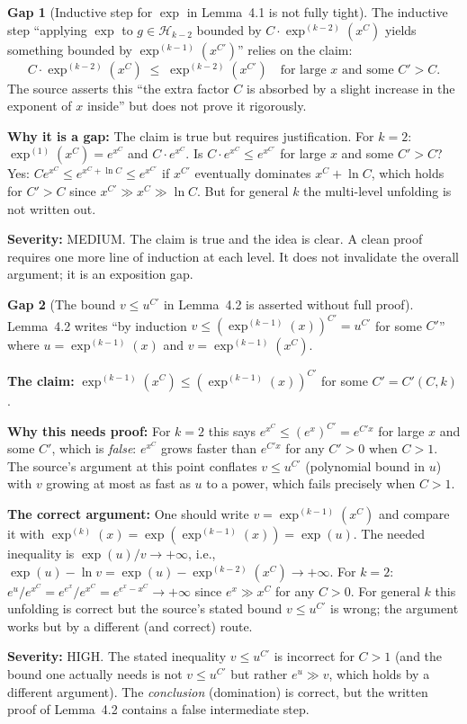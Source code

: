 \documentclass[12pt,a4paper]{article}
\theoremstyle{definition}
\newtheorem{gap}{Gap}
\theoremstyle{remark}
\begin{document}
\begin{gap}[Inductive step for $\exp$ in Lemma~4.1 is not fully
tight]\label{gap:exp-step}
The inductive step ``applying $\exp$ to $g\in\mathcal{H}_{k-2}$ bounded by
$C\cdot\exp^{(k-2)}(x^C)$ yields something bounded by $\exp^{(k-1)}(x^{C'})$''
relies on the claim:
\[
  C\cdot\exp^{(k-2)}(x^C) \;\leq\; \exp^{(k-2)}(x^{C'})
  \quad\text{for large }x\text{ and some }C'>C.
\]
The source asserts this ``the extra factor $C$ is absorbed by a slight increase
in the exponent of $x$ inside'' but does not prove it rigorously.

\noindent\textbf{Why it is a gap:} The claim is true but requires justification.
For $k=2$: $\exp^{(1)}(x^C)=e^{x^C}$ and $C\cdot e^{x^C}$.
Is $C\cdot e^{x^C}\leq e^{x^{C'}}$ for large $x$ and some $C'>C$?
Yes: $Ce^{x^C}\leq e^{x^C+\ln C}\leq e^{x^{C'}}$ if $x^{C'}$ eventually
dominates $x^C+\ln C$, which holds for $C'>C$ since $x^{C'}\gg x^C\gg\ln C$.
But for general $k$ the multi-level unfolding is not written out.

\noindent\textbf{Severity:} MEDIUM. The claim is true and the idea is clear.
A clean proof requires one more line of induction at each level.  It does not
invalidate the overall argument; it is an exposition gap.
\end{gap}

\begin{gap}[The bound $v\leq u^{C'}$ in Lemma~4.2 is asserted without full
proof]\label{gap:dom-step}
Lemma~4.2 writes ``by induction $v\leq(\exp^{(k-1)}(x))^{C'}=u^{C'}$ for
some $C'$'' where $u=\exp^{(k-1)}(x)$ and $v=\exp^{(k-1)}(x^C)$.

\noindent\textbf{The claim:} $\exp^{(k-1)}(x^C)\leq(\exp^{(k-1)}(x))^{C'}$
for some $C'=C'(C,k)$.

\noindent\textbf{Why this needs proof:} For $k=2$ this says $e^{x^C}\leq(e^x)^{C'}=e^{C'x}$
for large $x$ and some $C'$, which is \emph{false}: $e^{x^C}$ grows faster than
$e^{C'x}$ for any $C'>0$ when $C>1$.  The source's argument at this point
conflates $v\leq u^{C'}$ (polynomial bound in $u$) with $v$ growing at most
as fast as $u$ to a power, which fails precisely when $C>1$.

\noindent\textbf{The correct argument:} One should write
$v=\exp^{(k-1)}(x^C)$ and compare it with
$\exp^{(k)}(x)=\exp(\exp^{(k-1)}(x))=\exp(u)$.
The needed inequality is $\exp(u)/v\to+\infty$, i.e.,
$\exp(u)-\ln v=\exp(u)-\exp^{(k-2)}(x^C)\to+\infty$.
For $k=2$: $e^u/e^{x^C}=e^{e^x}/e^{x^C}=e^{e^x-x^C}\to+\infty$ since
$e^x\gg x^C$ for any $C>0$.
For general $k$ this unfolding is correct but the source's stated bound
$v\leq u^{C'}$ is wrong; the argument works but by a different (and correct)
route.

\noindent\textbf{Severity:} HIGH.  The stated inequality $v\leq u^{C'}$ is
incorrect for $C>1$ (and the bound one actually needs is not $v\leq u^{C'}$
but rather $e^u\gg v$, which holds by a different argument).
The \emph{conclusion} (domination) is correct, but the written proof of
Lemma~4.2 contains a false intermediate step.
\end{gap}
\end{document}
